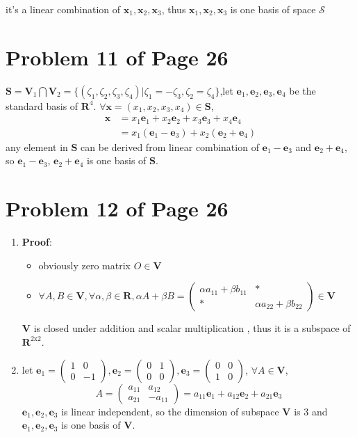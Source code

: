 \documentclass[12pt,a4paper]{article}
\newcommand{\mysection}[2]{
\section{Problem #1 of Page #2}	
	}
\begin{document}
it's a linear combination of $\mathbf{x}_1,\mathbf{x}_2,\mathbf{x}_3$,
thus $\mathbf{x}_1,\mathbf{x}_2,\mathbf{x}_3$ is one basis of space $\mathcal{S}$
\mysection{11}{26} 
$\mathbf{S} = \mathbf{V}_1 \bigcap  \mathbf{V}_2 =
\{(\zeta_1,\zeta_2,\zeta_3,\zeta_4)|\zeta_1 = -\zeta_3, \zeta_2 = \zeta_4
\}
$,let $\mathbf{e}_1,\mathbf{e}_2,\mathbf{e}_3,\mathbf{e}_4$
be the standard basis of $\mathbf{R}^{4}$.
$\forall \mathbf{x} = (x_1,x_2,x_3,x_4) \in \mathbf{S}$, \\
\begin{equation}
\begin{split}
\mathbf{x} &= x_1 \mathbf{e}_1 + x_2\mathbf{e}_2 + x_3\mathbf{e}_3 + x_4\mathbf{e}_4 \\
&= x_1(\mathbf{e}_1 -\mathbf{e}_3) + x_2(\mathbf{e}_2 + \mathbf{e}_4)
\end{split} 
\end{equation} 
any element in $\mathbf{S}$ can be derived from linear combination of
$\mathbf{e}_1 - \mathbf{e}_3$ and $\mathbf{e}_2 + \mathbf{e}_4$,
so $\mathbf{e}_1 - \mathbf{e}_3$, $\mathbf{e}_2 + \mathbf{e}_4$ is one basis of $\mathbf{S}$.
\mysection{12}{26}
\begin{enumerate}[(1)]
\item \textbf{Proof}: 
\begin{itemize}
	\item obviously zero matrix $O \in \mathbf{V}$ 
	\item $\forall A,B \in \mathbf{V},\forall \alpha,\beta \in \mathbf{R},
		\alpha A + \beta B = \left(
		\begin{array}{cc}
		 \alpha a_{11} + \beta b_{11} & * \\
		 * & \alpha a_{22} + \beta b_{22}
		\end{array} 
		\right) \in \mathbf{V}
	$
\end{itemize}
$\mathbf{V}$ is closed under addition and scalar multiplication ,
thus it is a subspace of $\mathbf{R}^{2\text{x}2}$.
\item let $ 
\mathbf{e}_1 = \left(
	\begin{array}{cc}
	 1 & 0  \\
	 0 & -1  
	\end{array} 
\right),
\mathbf{e}_2 = \left(
\begin{array}{cc}
0 & 1  \\
0 & 0  
\end{array} 
\right),
\mathbf{e}_3 = \left(
\begin{array}{cc}
0 & 0  \\
1 & 0  
\end{array} 
\right)
$,
$\forall A \in \mathbf{V}$, \\
\[
A = \left( \begin{array}{cc}
a_{11} & a_{12} \\
a_{21} & -a_{11}
\end{array} \right) 
= a_{11}\mathbf{e}_1 + a_{12}\mathbf{e}_2 + 
a_{21}\mathbf{e}_3
\]
$\mathbf{e}_1,\mathbf{e}_2,\mathbf{e}_3$ is linear independent,
so the dimension of subspace $\mathbf{V}$ is 3
and $\mathbf{e}_1,\mathbf{e}_2,\mathbf{e}_3$ is one basis of $\mathbf{V}$.

\end{enumerate}
\end{document}
